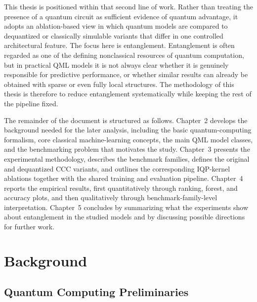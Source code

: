 \documentclass[12pt,a4paper,openany]{report}
\begin{document}
This thesis is positioned within that second line of work. Rather than treating the presence of a quantum circuit as sufficient evidence of quantum advantage, it adopts an ablation-based view in which quantum models are compared to dequantized or classically simulable variants that differ in one controlled architectural feature. The focus here is entanglement. Entanglement is often regarded as one of the defining nonclassical resources of quantum computation, but in practical QML models it is not always clear whether it is genuinely responsible for predictive performance, or whether similar results can already be obtained with sparse or even fully local structures. The methodology of this thesis is therefore to reduce entanglement systematically while keeping the rest of the pipeline fixed.

The remainder of the document is structured as follows. Chapter~2 develops the background needed for the later analysis, including the basic quantum-computing formalism, core classical machine-learning concepts, the main QML model classes, and the benchmarking problem that motivates the study. Chapter~3 presents the experimental methodology, describes the benchmark families, defines the original and dequantized CCC variants, and outlines the corresponding IQP-kernel ablations together with the shared training and evaluation pipeline. Chapter~4 reports the empirical results, first quantitatively through ranking, forest, and accuracy plots, and then qualitatively through benchmark-family-level interpretation. Chapter~5 concludes by summarizing what the experiments show about entanglement in the studied models and by discussing possible directions for further work.


\chapter{Background}

\section{Quantum Computing Preliminaries}
\end{document}
